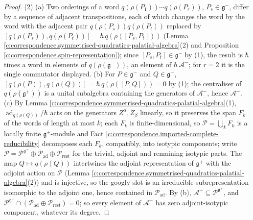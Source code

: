 \documentclass[11pt]{article}
\theoremstyle{definition}
\theoremstyle{plain}
\begin{document}
\begin{proof}
(2) (a) Two orderings of a word $q(\rho(P_1))\cdots q(\rho(P_r))$, $P_s \in \mathfrak{g}^-$, differ by a sequence of adjacent transpositions, each of which changes the word by the word with the adjacent pair $q(\rho(P_s))q(\rho(P_t))$ replaced by $[q(\rho(P_s)), q(\rho(P_t))] = \hbar\,q(\rho([P_s, P_t]))$ (Lemma \ref{c:correspondence.symmetrised-quadratics-palatial-algebra}(2) and Proposition \ref{c:correspondence.spin-representation}); since $[P_s, P_t] \in \mathfrak{g}^-$ by (1), the result is $\hbar$ times a word in elements of $q(\rho(\mathfrak{g}^-))$, an element of $\hbar\,\mathcal{A}^-$; for $r = 2$ it is the single commutator displayed. (b) For $P \in \mathfrak{g}^-$ and $Q \in \mathfrak{g}^+$, $[q(\rho(P)), q(\rho(Q))] = \hbar\,q(\rho([P,Q])) = 0$ by (1); the centraliser of $q(\rho(\mathfrak{g}^+))$ is a unital subalgebra containing the generators of $\mathcal{A}^-$, hence $\mathcal{A}^-$. (c) By Lemma \ref{c:correspondence.symmetrised-quadratics-palatial-algebra}(1), $\operatorname{ad}_{q(\rho(Q))}/\hbar$ acts on the generators $Z^\alpha, \bar Z_\beta$ linearly, so it preserves the span $F_k$ of the words of length at most $k$; each $F_k$ is finite-dimensional, so $\mathcal{P} = \bigcup_k F_k$ is a locally finite $\mathfrak{g}^+$-module and Fact \ref{c:correspondence.imported-complete-reducibility} decomposes each $F_k$, compatibly, into isotypic components; write $\mathcal{P} = \mathcal{P}^{\mathfrak{g}^+} \oplus \mathcal{P}_{\mathrm{ad}} \oplus \mathcal{P}_{\mathrm{rest}}$ for the trivial, adjoint and remaining isotypic parts. The map $Q \mapsto q(\rho(Q))$ intertwines the adjoint representation of $\mathfrak{g}^+$ with the adjoint action on $\mathcal{P}$ (Lemma \ref{c:correspondence.symmetrised-quadratics-palatial-algebra}(2)) and is injective, so the googly slot is an irreducible subrepresentation isomorphic to the adjoint one, hence contained in $\mathcal{P}_{\mathrm{ad}}$. By (b), $\mathcal{A}^- \subseteq \mathcal{P}^{\mathfrak{g}^+}$, and $\mathcal{P}^{\mathfrak{g}^+} \cap (\mathcal{P}_{\mathrm{ad}} \oplus \mathcal{P}_{\mathrm{rest}}) = 0$; so every element of $\mathcal{A}^-$ has zero adjoint-isotypic component, whatever its degree.

\end{proof}
\end{document}
